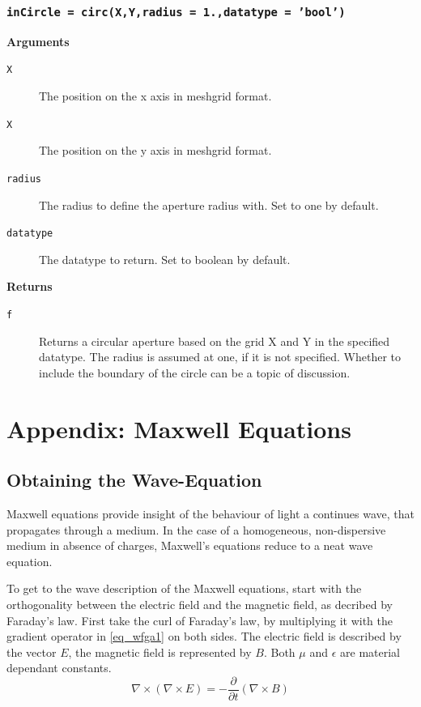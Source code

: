 \documentclass{article}
\begin{document}
\newpage
\subsubsection*{\texttt{inCircle = circ(X,Y,radius = 1.,datatype = 'bool')}}
\textbf{Arguments}
\begin{description}
	\item[\texttt{X}]
	The position on the x axis in meshgrid format.
	\item[\texttt{X}]
	The position on the y axis in meshgrid format.
	\item[\texttt{radius}]
	The radius to define the aperture radius with. Set to one by default.
	\item[\texttt{datatype}]
	The datatype to return. Set to boolean by default.
\end{description}
\textbf{Returns}
\begin{description}
	\item[\texttt{f}]
	Returns a circular aperture based on the grid X and Y in the specified datatype. The radius is assumed at one, if it is not specified. Whether to include the boundary of the circle can be a topic of discussion.
\end{description}

\newpage
\section{Appendix: Maxwell Equations}
\subsection{Obtaining the Wave-Equation}
Maxwell equations provide insight of the behaviour of light a continues wave, that propagates through a medium. In the case of a homogeneous, non-dispersive medium in absence of charges, Maxwell's equations reduce to a neat wave equation.

To get to the wave description of the Maxwell equations, start with the orthogonality between the electric field and the magnetic field, as decribed by  Faraday's law. First take the curl of Faraday's law, by multiplying it with the gradient operator in \ref{eq_wfga1} on both sides. The electric field is described by the vector $E$, the magnetic field is represented by $B$. Both $\mu$ and $\epsilon$ are material dependant constants.
\begin{equation}
\label{eq_wfga1}
\nabla \times (\nabla \times E) = -\frac{\partial}{\partial t}(\nabla \times B)
\end{equation}
\end{document}
